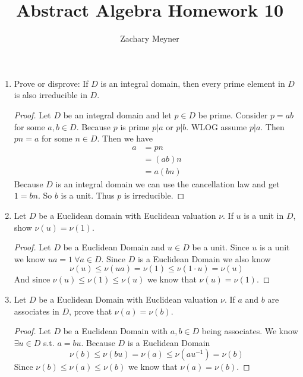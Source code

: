 \documentclass[12pt]{article}
\title{\large Abstract Algebra Homework 10}
\author{\large Zachary Meyner}
\date{}
\newcommand\setitemnumber[1]{\setcounter{enumi}{\numexpr#1-- -1\relax}}
\begin{document}
\maketitle
\begin{enumerate}[label=\textbf{\arabic*}.]
    \setitemnumber{5}
    \item Prove or disprove: If $D$ is an integral domain, then every prime element in $D$ is also 
    irreducible in $D$.
    \begin{proof}
        Let $D$ be an integral domain and let $p \in D$ be prime. Consider $p = ab$ for some 
        $a,b \in D$. Because $p$ is prime $p|a$ or $p|b$. WLOG assume $p|a$. Then $pn = a$ for some 
        $n \in D$. Then we have
        \begin{align*}
            a &= pn \\
            &= (ab)n \\
            &= a(bn)
        \end{align*}
        Because $D$ is an integral domain we can use the cancellation law and get $1=bn$. So $b$ 
        is a unit. Thus $p$ is irreducible.
    \end{proof}

    \setitemnumber{14}
    \item Let $D$ be a Euclidean domain with Euclidean valuation $\nu$. If $u$ is a unit in $D$, show 
    $\nu(u) = \nu(1)$.
    \begin{proof}
        Let $D$ be a Euclidean Domain and $u \in D$ be a unit. Since $u$ is a unit we know 
        $ua = 1 \ \forall a \in D$. Since $D$ is a Euclidean Domain we also know 
        \[\nu(u) \leq \nu(ua) = \nu(1) \leq \nu(1 \cdot u) = \nu(u)\]
        And since $\nu(u) \leq \nu(1) \leq \nu(u)$ we know that $\nu(u) = \nu(1)$. 
    \end{proof}

    \item Let $D$ be a Euclidean Domain with Euclidean valuation $\nu$. If $a$ and $b$ are associates in 
    $D$, prove that $\nu(a) = \nu(b)$.
    \begin{proof}
        Let $D$ be a Euclidean Domain with $a,b \in D$ being associates. We know $\exists u \in D$ 
        s.t. $a = bu$. Because $D$ is a Euclidean Domain 
        \[\nu(b) \leq \nu(bu) = \nu(a) \leq \nu(au^{-1}) = \nu(b)\]
        Since $\nu(b) \leq \nu(a) \leq \nu(b)$ we know that $\nu(a) = \nu(b)$. 
    \end{proof}
\end{enumerate}
\end{document}
